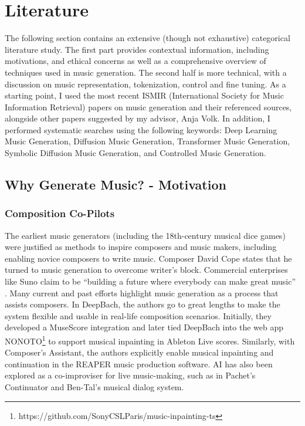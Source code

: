 

\chapter{Literature} \label{chap:data}
\pagestyle{fancy}

The following section contains an extensive (though not exhaustive) categorical literature study. The first part provides contextual information, including motivations, and ethical concerns as well as a comprehensive overview of techniques used in music generation. The second half is more technical, with a discussion on music representation, tokenization, control and fine tuning. As a starting point, I used the most recent ISMIR (International Society for Music Information Retrieval) papers on music generation and their referenced sources, alongside other papers suggested by my advisor, Anja Volk. In addition, I performed systematic searches using the following keywords: Deep Learning Music Generation, Diffusion Music Generation, Transformer Music Generation, Symbolic Diffusion Music Generation, and Controlled Music Generation.

\section{Why Generate Music? - Motivation}
\label{section:motivation}
\subsection{Composition Co-Pilots}
The earliest music generators (including the 18th-century musical dice games\cite{Nierhaus_2009}) were justified as methods to inspire composers and music makers, including enabling novice composers to write music. Composer David Cope\cite{Cope_1989} states that he turned to music generation to overcome writer’s block. Commercial enterprises like Suno claim to be “building a future where everybody can make great music” \cite{Suno_AI}. Many current and past efforts highlight music generation as a process that assists composers. In DeepBach\cite{Hadjeres_Pachet_Nielsen_2017}, the authors go to great lengths to make the system flexible and usable in real-life composition scenarios. Initially, they developed a MuseScore integration and later tied DeepBach into the web app NONOTO\footnote{https://github.com/SonyCSLParis/music-inpainting-ts} to support musical inpainting in Ableton Live scores. Similarly, with Composer’s Assistant\cite{Malandro_2023}, the authors explicitly enable musical inpainting and continuation in the REAPER music production software. AI has also been explored as a co-improviser for live music-making, such as in Pachet's Continuator\cite{Pachet_2003} and Ben-Tal's musical dialog system\cite{Kite-Powell_2023}.

